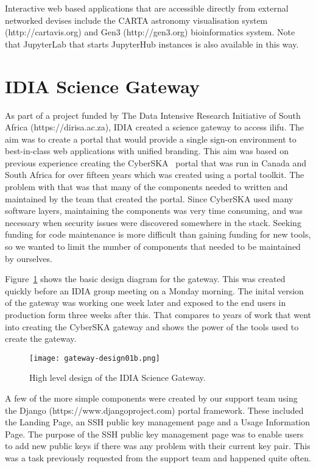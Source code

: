 \documentclass{iau_FM}
\begin{document}
Interactive web based applications that are accessible directly from external networked devises include
the CARTA astronomy visualisation system (http://cartavis.org) and Gen3 (http://gen3.org) bioinformatics system. 
Note that JupyterLab that starts
JupyterHub instances is also available in this way.


\section{IDIA Science Gateway}
\label{sec:gateway}

As part of a project funded by The Data Intensive Research Initiative of South Africa (https://dirisa.ac.za), 
IDIA created a science gateway to access {\sc ilifu}. The aim was to create
a portal that would provide a single sign-on environment to best-in-class web applications with unified branding. 
This aim was based on 
previous experience creating the CyberSKA~\cite{cyberska} portal that was run in
 Canada and South Africa for over fifteen 
years which
was created using a portal toolkit. The problem with that was that many of the components needed to written and maintained
by the team that created the portal. Since CyberSKA used many software 
layers, maintaining the components was very time consuming, and was necessary when security issues were discovered
somewhere in the stack.
Seeking funding for code maintenance is more difficult than gaining funding 
for new tools, so we wanted to limit the number of
components that needed to be maintained by ourselves.

Figure~\ref{fig:gateway_design} shows the basic design diagram for the gateway. This was created
quickly before an IDIA group meeting on a Monday morning. The inital version of the gateway was working one week later and
exposed to the end users in production form three weeks after this. That compares to years of work that went
 into creating the CyberSKA gateway
and shows the power of the tools used to create the gateway.

\begin{figure}
    \centering
    \texttt{[image: gateway-design01b.png]}
    \caption{High level design of the IDIA Science Gateway.}
    \label{fig:gateway_design}
\end{figure}

A few of the more simple components were created by our support team using the Django 
(https://www.djangoproject.com)
portal framework.
These included the Landing Page, an SSH public 
key management page and a Usage Information
Page. The purpose of the SSH public key management page was to enable users to add new public keys if
there was any problem with their current key pair. This was a task previously requested from the
support team and happened quite often.
\end{document}
